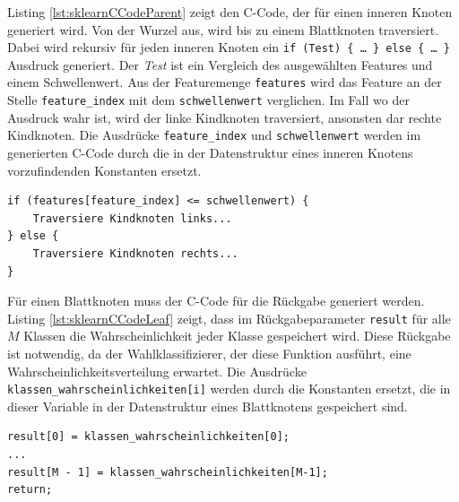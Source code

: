 Listing \ref{lst:sklearnCCodeParent} zeigt den C-Code, der für einen inneren Knoten generiert wird. Von der Wurzel aus, wird bis zu einem Blattknoten traversiert. Dabei wird rekursiv für jeden inneren
Knoten ein \texttt{if (Test) \{ \ldots\ \} else \{ \ldots\ \}} Ausdruck generiert. Der \textit{Test} ist ein Vergleich des ausgewählten Features und einem Schwellenwert. Aus der Featuremenge \texttt{features}
wird das Feature an der Stelle \texttt{feature\_index} mit dem \texttt{schwellenwert} verglichen. Im Fall wo der Ausdruck wahr ist, wird der linke Kindknoten traversiert, ansonsten dar rechte Kindknoten.
Die Ausdrücke \texttt{feature\_index} und \texttt{schwellenwert} werden im generierten C-Code durch die in der Datenstruktur eines inneren Knotens vorzufindenden Konstanten ersetzt.
\begin{lstlisting}[label=lst:sklearnCCodeParent,caption={C-Code eines inneren Knotens.}]
if (features[feature_index] <= schwellenwert) {
    Traversiere Kindknoten links...
} else {
    Traversiere Kindknoten rechts...
}
\end{lstlisting}
Für einen Blattknoten muss der C-Code für die Rückgabe generiert werden. Listing \ref{lst:sklearnCCodeLeaf} zeigt, dass im Rückgabeparameter \texttt{result} für alle $M$ Klassen die Wahrscheinlichkeit
jeder Klasse gespeichert wird. Diese Rückgabe ist notwendig, da der Wahlklassifizierer, der diese Funktion ausführt, eine Wahrscheinlichkeitsverteilung erwartet.
Die Ausdrücke \texttt{klassen\_wahrscheinlichkeiten[i]} werden durch die Konstanten ersetzt, die in dieser Variable in der Datenstruktur eines Blattknotens gespeichert sind.
\begin{lstlisting}[label=lst:sklearnCCodeLeaf,caption={C-Code eines Blattknotens.}]
result[0] = klassen_wahrscheinlichkeiten[0];
...
result[M - 1] = klassen_wahrscheinlichkeiten[M-1];
return;
\end{lstlisting}

